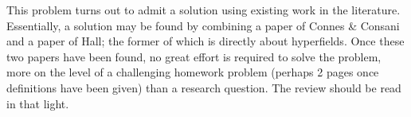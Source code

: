 This problem turns out to admit a solution using existing work in the literature. Essentially, a solution may be found by combining a paper of Connes \& Consani and a paper of Hall; the former of which is directly about hyperfields. Once these two papers have been found, no great effort is required to solve the problem, more on the level of a challenging homework problem (perhaps 2 pages once definitions have been given) than a research question. The review should be read in that light.